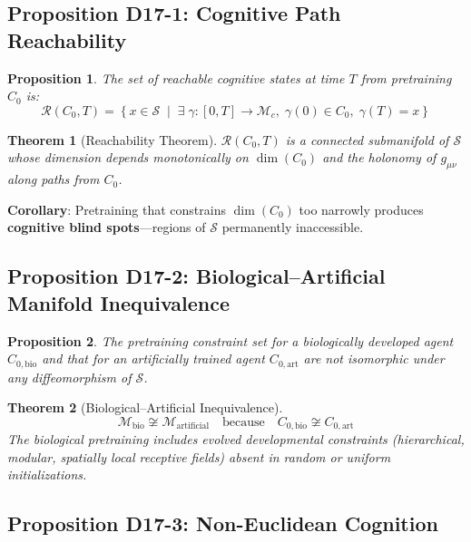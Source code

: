 \documentclass[12pt, a4paper]{article}
\newtheorem{theorem}{Theorem}[section]
\newtheorem{proposition}{Proposition}[section]
\begin{document}
\subsection{Proposition D17-1: Cognitive Path Reachability}

\begin{proposition}\label{prop:D17-1}
The set of reachable cognitive states at time $T$ from pretraining $C_0$ is:
\[
\mathcal{R}(C_0, T) = \left\{ x \in \mathcal{S} \;\middle|\; \exists\;\gamma: [0,T] \to \mathcal{M}_c,\;\gamma(0) \in C_0,\;\gamma(T) = x \right\}
\]
\end{proposition}

\begin{theorem}[Reachability Theorem]\label{thm:D17-2}
$\mathcal{R}(C_0, T)$ is a connected submanifold of $\mathcal{S}$ whose dimension depends monotonically on $\dim(C_0)$ and the holonomy of $g_{\mu\nu}$ along paths from $C_0$.
\end{theorem}

\textbf{Corollary}: Pretraining that constrains $\dim(C_0)$ too narrowly produces \textbf{cognitive blind spots}---regions of $\mathcal{S}$ permanently inaccessible.

\subsection{Proposition D17-2: Biological--Artificial Manifold Inequivalence}

\begin{proposition}\label{prop:D17-2}
The pretraining constraint set for a biologically developed agent $C_{0,\mathrm{bio}}$ and that for an artificially trained agent $C_{0,\mathrm{art}}$ are not isomorphic under any diffeomorphism of $\mathcal{S}$.
\end{proposition}

\begin{theorem}[Biological--Artificial Inequivalence]\label{thm:D17-3}
\[
\mathcal{M}_{\mathrm{bio}} \not\cong \mathcal{M}_{\mathrm{artificial}}\quad\text{because}\quad C_{0,\mathrm{bio}} \not\cong C_{0,\mathrm{art}}
\]
The biological pretraining includes evolved developmental constraints (hierarchical, modular, spatially local receptive fields) absent in random or uniform initializations.
\end{theorem}

\subsection{Proposition D17-3: Non-Euclidean Cognition}
\end{document}
